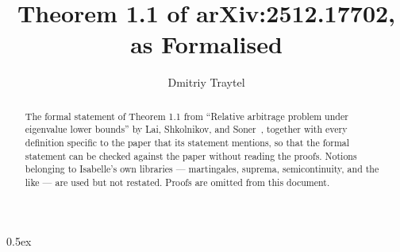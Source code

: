 \documentclass[11pt,a4paper]{article}
\begin{document}
\title{Theorem 1.1 of arXiv:2512.17702, as Formalised}
\author{Dmitriy Traytel}
\maketitle

\begin{abstract}
\noindent{}
The formal statement of Theorem 1.1 from ``Relative arbitrage problem under eigenvalue lower bounds'' by Lai, Shkolnikov, and Soner~\cite{LaiShkolnikovSoner}, together with every definition specific to the paper that its statement mentions, so that the formal statement can be checked against the paper without reading the proofs.  Notions belonging to Isabelle's own libraries --- martingales, suprema, semicontinuity, and the like --- are used but not restated.  Proofs are omitted from this document.
\end{abstract}


\bigskip

\parindent 0pt\parskip 0.5ex





\end{document}
